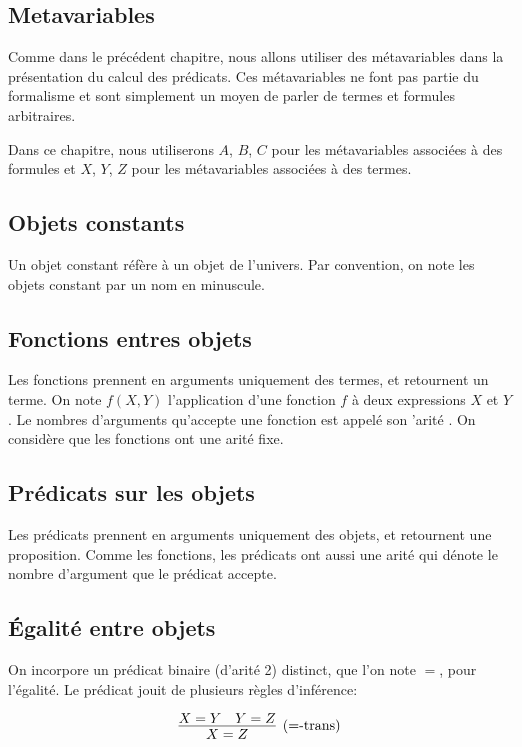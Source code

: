 \subsection{Metavariables}

Comme dans le précédent chapitre, nous allons utiliser des métavariables dans la présentation du calcul des prédicats.
Ces métavariables ne font pas partie du formalisme et sont simplement un moyen de parler de termes et formules arbitraires.

Dans ce chapitre, nous utiliserons $A$, $B$, $C$ pour les métavariables associées à des formules et $X$, $Y$, $Z$ pour les métavariables associées à des termes.

\subsection{Objets constants}

Un objet constant réfère à un objet de l'univers. Par convention, on note les objets constant par un nom en minuscule.

\subsection{Fonctions entres objets}

Les fonctions prennent en arguments uniquement des termes, et retournent un terme.
On note $f(X, Y)$ l'application d'une fonction $f$ à deux expressions $X$ et $Y$.
Le nombres d'arguments qu'accepte une fonction est appelé son '\og arité \fg{}.
On considère que les fonctions ont une arité fixe.

\subsection{Prédicats sur les objets}

Les prédicats prennent en arguments uniquement des objets, et retournent une proposition.
Comme les fonctions, les prédicats ont aussi une arité qui dénote le nombre d'argument que le prédicat accepte.

\subsection{Égalité entre objets}

On incorpore un prédicat binaire (d'arité 2) distinct, que l'on note ${=}$, pour l'égalité.
Le prédicat jouit de plusieurs règles d'inférence:

\[
\infer[({=}\text{-trans})]{X = Z}{X = Y & Y = Z}
\]

